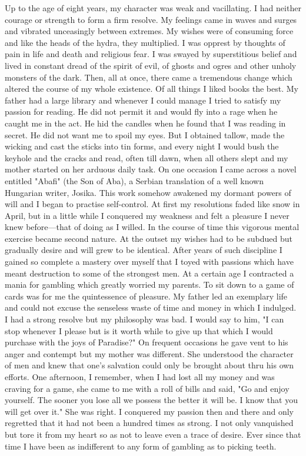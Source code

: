 \documentclass[a4paper,12pt,english,twoside,openright]{memoir}
\begin{document}
	Up to the age of eight years, my character was weak and vacillating.  I had neither courage or 
	strength to form a firm resolve.  My feelings came in waves and surges and vibrated unceasingly 
	between extremes.  My wishes were of consuming force and like the heads of the hydra, they 
	multiplied.  I was opprest by thoughts of pain in life and death and religious fear.  I was swayed by 
	superstitious belief and lived in constant dread of the spirit of evil, of ghosts and ogres and other 
	unholy monsters of the dark.  Then, all at once, there came a tremendous change which altered 
	the course of my whole existence.  Of all things I liked books the best.  My father had a large 
	library and whenever I could manage I tried to satisfy my passion for reading.  He did not permit it 
	and would fly into a rage when he caught me in the act.  He hid the candles when he found that I 
	was reading in secret.  He did not want me to spoil my eyes.  But I obtained tallow, made the 
	wicking and cast the sticks into tin forms, and every night I would bush the keyhole and the 
	cracks and read, often till dawn, when all others slept and my mother started on her arduous daily 
	task.  On one occasion I came across a novel entitled "Abafi" (the Son of Aba), a Serbian 
	translation of a well known Hungarian writer, Josika.  This work somehow awakened my dormant 
	powers of will and I began to practise self-control.  At first my resolutions faded like snow in April, 
	but in a little while I conquered my weakness and felt a pleasure I never knew before—that of 
	doing as I willed.  In the course of time this vigorous mental exercise became second nature.  At 
	the outset my wishes had to be subdued but gradually desire and will grew to be identical.  After 
	years of such discipline I gained so complete a mastery over myself that I toyed with passions 
	which have meant destruction to some of the strongest men.  At a certain age I contracted a 
	mania for gambling which greatly worried my parents.  To sit down to a game of cards was for me 
	the quintessence of pleasure.  My father led an exemplary life and could not excuse the 
	senseless waste of time and money in which I indulged.  I had a strong resolve but my philosophy 
	was bad.  I would say to him, "I can stop whenever I please but is it worth while to give up that 
	which I would purchase with the joys of Paradise?" On frequent occasions he gave vent to his 
	anger and contempt but my mother was different.  She understood the character of men and 
	knew that one's salvation could only be brought about thru his own efforts.  One afternoon, I 
	remember, when I had lost all my money and was craving for a game, she came to me with a roll 
	of bills and said, "Go and enjoy yourself.  The sooner you lose all we possess the better it will be.  
	I know that you will get over it." She was right.  I conquered my passion then and there and only 
	regretted that it had not been a hundred times as strong.  I not only vanquished but tore it from 
	my heart so as not to leave even a trace of desire.  Ever since that time I have been as indifferent 
	to any form of gambling as to picking teeth.  
	
\end{document}
